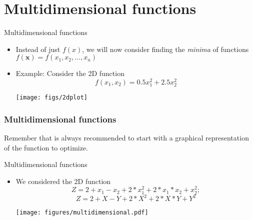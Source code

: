 \documentclass[xcolor=dvipsnames,11pt]{beamer}
\begin{document}
\section{Multidimensional functions}

\begin{frame}{Multidimensional functions}
	\begin{itemize}
		\item Instead of just $f(x)$, we will now consider finding the \textit{minima} of functions $f(\mathbf{x}) = f(x_1, x_2, ..., x_n)$
		\item Example: Consider the 2D function
		$$f(x_1, x_2) = 0.5 x_1^2 + 2.5 x_2^2$$
		\begin{center}
			\texttt{[image: figs/2dplot]}
		\end{center}
		
	\end{itemize}
\end{frame}

\begin{frame}[fragile]
	\frametitle{Multidimensional functions}
	
\vspace{-9pt}


\vspace{-9pt}
\begin{alertblock}{}
Remember that is always recommended to start with a graphical representation of the function to optimize.
\end{alertblock}
	
\end{frame}


\begin{frame}{Multidimensional functions}
\begin{itemize}
	\item We considered the 2D function
	$$Z = 2+x_1-x_2+2*x_1^2+2*x_1*x_2+x_2^2;$$	
	$$Z = 2+X-Y+2*X^2+2*X*Y+Y^2$$
	\begin{center}
		\texttt{[image: figures/multidimensional.pdf]}
	\end{center}
	
\end{itemize}
\end{frame}
\end{document}

